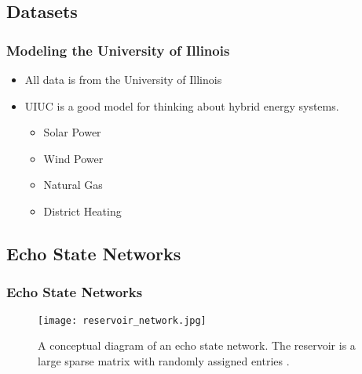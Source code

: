 \subsection{Datasets}
\begin{frame}
  \frametitle{Modeling the University of Illinois}
  \begin{itemize}
    \item All data is from the University of Illinois
    \item UIUC is a good model for thinking about hybrid energy systems.
    \begin{itemize}
      \item Solar Power
      \item Wind Power
      \item Natural Gas
      \item District Heating
    \end{itemize}
  \end{itemize}
\end{frame}

\subsection{Echo State Networks}
\begin{frame}
  \frametitle{Echo State Networks}
  \begin{figure}
    \texttt{[image: reservoir\_network.jpg]}
    \caption{A conceptual diagram of an echo state network. The reservoir is a large sparse matrix with randomly assigned entries \cite{pathak_model-free_2018, lukosevicius_practical_2012}.}
    \label{fig:resnet}
  \end{figure}
\end{frame}

